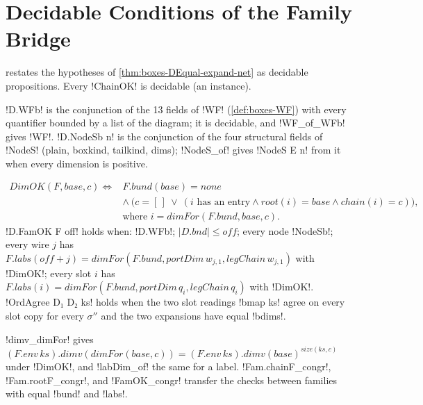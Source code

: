 {\section{Decidable Conditions of the Family Bridge}\label{sec:boxes-famcheck}

 restates the hypotheses of \cref{thm:boxes-DEqual-expand-net} as decidable propositions. Every \lbx!ChainOK! is decidable (an instance).

\begin{definition}\label{def:boxes-WFb}
\lbx!D.WFb! is the conjunction of the 13 fields of \lbx!WF! (\cref{def:boxes-WF}) with every quantifier bounded by a list of the diagram; it is decidable, and \lbx!WF_of_WFb! gives \lbx!WF!. \lbx!D.NodeSb n! is the conjunction of the four structural fields of \lbx!NodeS! (plain, boxkind, tailkind, dims); \lbx!NodeS_of! gives \lbx!NodeS E n! from it when every dimension is positive.
\end{definition}

\begin{definition}\label{def:boxes-FamOK}
\begin{align*}
\mathit{DimOK}(F,\mathit{base},c)\iff{}&F.\mathit{bund}(\mathit{base})=\mathit{none}\\ &\wedge\ \bigl(c=[\,]\ \vee\ (i\text{ has an entry}\wedge\mathit{root}(i)=\mathit{base}\wedge\mathit{chain}(i)=c)\bigr),\\
&\text{where } i=\mathit{dimFor}(F.\mathit{bund},\mathit{base},c).
\end{align*}
\lbx!D.FamOK F off! holds when: \lbx!D.WFb!; $|D.\mathit{bnd}|\le\mathit{off}$; every node \lbx!NodeSb!; every wire $j$ has $F.\mathit{labs}(\mathit{off}+j)=\mathit{dimFor}(F.\mathit{bund},\mathit{portDim}\,w_{j,1},\mathit{legChain}\,w_{j,1})$ with \lbx!DimOK!; every slot $i$ has $F.\mathit{labs}(i)=\mathit{dimFor}(F.\mathit{bund},\mathit{portDim}\,q_i,\mathit{legChain}\,q_i)$ with \lbx!DimOK!. \lbx!OrdAgree D₁ D₂ ks! holds when the two slot readings \lbx!bmap ks! agree on every slot copy for every $\sigma''$ and the two expansions have equal \lbx!bdims!.
\end{definition}
\lbx!dimv_dimFor! gives $(F.\mathit{env}\,\mathit{ks}).\mathit{dimv}(\mathit{dimFor}(\mathit{base},c))=(F.\mathit{env}\,\mathit{ks}).\mathit{dimv}(\mathit{base})^{\mathit{size}(\mathit{ks},c)}$ under \lbx!DimOK!, and \lbx!labDim_of! the same for a label. \lbx!Fam.chainF_congr!, \lbx!Fam.rootF_congr!, and \lbx!FamOK_congr! transfer the checks between families with equal \lbx!bund! and \lbx!labs!.

}
